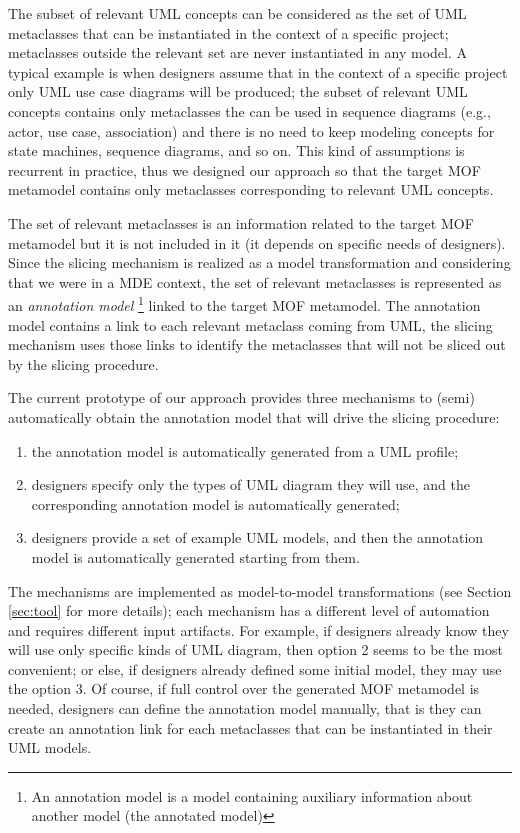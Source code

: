 The subset of relevant UML concepts can be considered as the set of UML metaclasses that can be instantiated in the context of a specific project;
metaclasses outside the relevant set are never instantiated in any model.
A typical example is when designers assume that in the context of a specific project only UML
use case diagrams will be produced; the subset of relevant UML concepts contains only metaclasses 
the can be used in sequence diagrams (e.g., actor, use case, association) and there is no need to keep modeling concepts
for state machines, sequence diagrams, and so on.
This kind of assumptions is recurrent in practice, thus we designed our approach so that the target MOF metamodel contains only 
metaclasses corresponding to relevant UML concepts.

The set of relevant metaclasses is an information related to the target MOF metamodel but it is not included in it (it depends on specific needs of designers). 
Since the slicing mechanism is realized as a model transformation and considering that we were in a MDE context, the set of relevant
metaclasses is represented as an \textit{annotation model}
\footnote{An annotation model is a model containing auxiliary information about another model (the annotated model)\cite{MCDFthesis}} linked to the target MOF metamodel. The annotation model contains a link to each relevant metaclass coming from UML, the slicing mechanism uses those links to identify the metaclasses that will not be sliced out by the slicing procedure.

The current prototype of our approach provides three mechanisms to (semi) automatically obtain the annotation model that will drive the slicing procedure:

\begin{enumerate}
	\item the annotation model is automatically generated from a UML profile;
	\item designers specify only the types of UML diagram they will use, and the corresponding annotation model is automatically generated;
	\item designers provide a set of example UML models, and then the annotation model is automatically generated starting from them.
\end{enumerate}

The mechanisms are implemented as model-to-model transformations (see Section \ref{sec:tool} for more details);
each mechanism has a different level of automation and requires different input artifacts.
For example, if designers already know they will use only specific kinds of UML diagram, then option 2 seems to be the most convenient;
or else, if designers already defined some initial model, they may use the option 3.
Of course, if full control over the generated MOF metamodel is needed, designers can define the annotation model manually, that is they can create an annotation link for each metaclasses that can be instantiated in their UML models.

